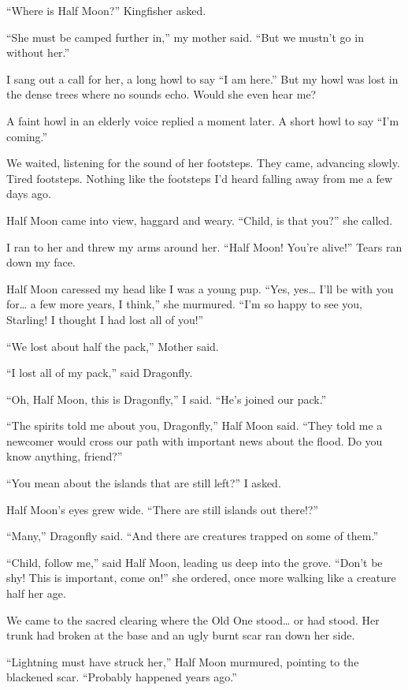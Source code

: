 ``Where is Half Moon?'' Kingfisher asked.

``She must be camped further in,'' my mother said. ``But we mustn't go in without her.''

I sang out a call for her, a long howl to say ``I am here.'' But my howl was lost in the dense trees where no sounds echo. Would she even hear me?

A faint howl in an elderly voice replied a moment later. A short howl to say ``I'm coming.''

We waited, listening for the sound of her footsteps. They came, advancing slowly. Tired footsteps. Nothing like the footsteps I'd heard falling away from me a few days ago.

Half Moon came into view, haggard and weary. ``Child, is that you?'' she called.

I ran to her and threw my arms around her. ``Half Moon! You're alive!'' Tears ran down my face.

Half Moon caressed my head like I was a young pup. ``Yes, yes\ldots{} I'll be with you for\ldots{} a few more years, I think,'' she murmured. ``I'm so happy to see you, Starling! I thought I had lost all of you!''

``We lost about half the pack,'' Mother said.

``I lost all of my pack,'' said Dragonfly.

``Oh, Half Moon, this is Dragonfly,'' I said. ``He's joined our pack.''

``The spirits told me about you, Dragonfly,'' Half Moon said. ``They told me a newcomer would cross our path with important news about the flood. Do you know anything, friend?''

``You mean about the islands that are still left?'' I asked.

Half Moon's eyes grew wide. ``There are still islands out there!?''

``Many,'' Dragonfly said. ``And there are creatures trapped on some of them.''

``Child, follow me,'' said Half Moon, leading us deep into the grove. ``Don't be shy! This is important, come on!'' she ordered, once more walking like a creature half her age.

We came to the sacred clearing where the Old One stood\ldots{} or had stood. Her trunk had broken at the base and an ugly burnt scar ran down her side.

``Lightning must have struck her,'' Half Moon murmured, pointing to the blackened scar. ``Probably happened years ago.''

